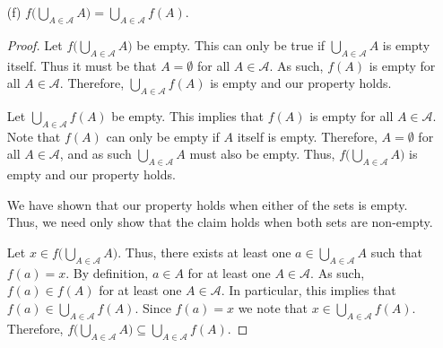 \documentclass[12pt]{article}
\begin{document}
\begin{enumerate}
\begin{proof}
		Let $a \in f^{-1}\big(\bigcap_{B \in \mathcal{B}} B\big)$. By definition,
		$f(a) \in \bigcap_{B \in \mathcal{B}} B$. Thus, we have that 
		$f(a) \in B$ for all $B \in \mathcal{B}$. In particular, it must be that 
		$a \in f^{-1}(B)$ for all $B \in \mathcal{B}$. Hence, 
		$a \in \bigcap_{B \in \mathcal{B}} f^{-1}(B)$ by definition. Therefore we 
		conclude that $f^{-1}\big(\bigcap_{B \in \mathcal{B}} B\big) \subseteq
		\bigcap_{B \in \mathcal{B}} f^{-1}(B)$.
		
		Let $a \in \bigcap_{B \in \mathcal{B}} f^{-1}(B)$. By definition,
		$a \in f^{-1}(B)$ for all $B \in \mathcal{B}$. This implies that 
		$f(a) \in B$ for all $B \in \mathcal{B}$. By definition, it must be 
		that $f(a) \in \bigcap_{B \in \mathcal{B}} B$. Therefore, we conclude 
		that $a \in f^{-1} \big(\bigcap_{B \in \mathcal{B}} B\big)$.
		Hence we have that $f^{-1} \big(\bigcap_{B \in \mathcal{B}} B\big) = 
		\bigcap_{B \in \mathcal{B}} f^{-1}(B)$.
	\end{proof}
	\item[(f)] $f\big(\bigcup_{A \in \mathcal{A}} A\big) = 
	\bigcup_{A \in \mathcal{A}} f(A)$.
	\begin{proof}
		Let $f\big(\bigcup_{A \in \mathcal{A}} A\big)$ be empty. This can only be true
		if $\bigcup_{A \in \mathcal{A}} A$ is empty itself. Thus it must be that 
		$A = \emptyset$ for all $A \in \mathcal{A}$. As such, $f(A)$ is empty 
		for all $A \in \mathcal{A}$. Therefore, $\bigcup_{A \in \mathcal{A}} f(A)$
		is empty and our property holds.
		
		Let $\bigcup_{A \in \mathcal{A}} f(A)$ be empty. This implies that 
		$f(A)$ is empty for all $A \in \mathcal{A}$. Note that $f(A)$ can only 
		be empty if $A$ itself is empty. Therefore, $A = \emptyset$ for all 
		$A \in \mathcal{A}$, and as such $\bigcup_{A \in \mathcal{A}} A$ must also
		be empty. Thus, $f\big(\bigcup_{A \in \mathcal{A}} A\big)$ is empty and our 
		property holds.
		
		We have shown that our property holds when either of the sets is empty. Thus,
		we need only show that the claim holds when both sets are non-empty.
		
		Let $x \in f\big(\bigcup_{A \in \mathcal{A}} A\big)$. Thus, there exists
		at least one $a \in \bigcup_{A \in \mathcal{A}} A$ such that ${f(a) = x}$.
		By definition, $a \in A$ for at least one $A \in \mathcal{A}$. As such,
		$f(a) \in f(A)$ for at least one $A \in \mathcal{A}$. In particular, this 
		implies that $f(a) \in \bigcup_{A \in \mathcal{A}} f(A)$. Since 
		$f(a) = x$ we note that $x \in \bigcup_{A \in \mathcal{A}} f(A)$.
		Therefore, $f\big(\bigcup_{A \in \mathcal{A}} A\big) \subseteq 
		\bigcup_{A \in \mathcal{A}} f(A)$.
		

\end{proof}
\end{enumerate}
\end{document}
